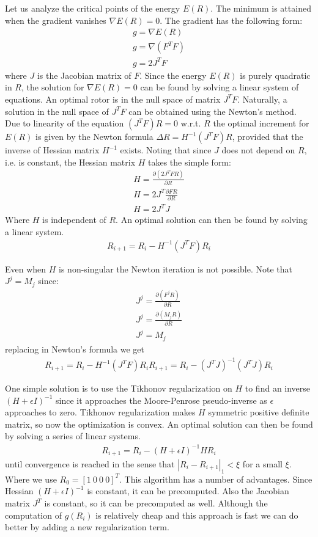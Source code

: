 \documentclass{birkjour}
\numberwithin{equation}{section}
\begin{document}
Let us analyze the critical points of the energy $E(R)$. The minimum is attained when the gradient vanishes $\nabla E(R) = 0$. The gradient has the following form:
\begin{eqnarray*}
g = \nabla E(R)\\
g = \nabla (F^T F)\\
g = 2 J^T F
\end{eqnarray*}
where $J$ is the Jacobian matrix of $F$. Since the energy $E(R)$ is purely quadratic in $R$, the solution for $\nabla E(R) = 0$ can be found by solving a linear system of equations. An optimal rotor is in the null space of matrix $J^T F$. Naturally, a solution in the null space of $J^T F$ can be obtained using the Newton's method. Due to linearity of the equation $(J^T F) R = 0$ w.r.t. $R$ the optimal increment for $E(R)$ is given by the Newton formula $\Delta R = H^{-1} (J^T F) R$, provided that the inverse of Hessian matrix $H^{-1}$ exists. Noting that since $J$ does not depend on $R$, i.e. is constant, the Hessian matrix $H$ takes the simple form:
\begin{eqnarray*}
H = \frac{\partial(2 J^T F R)}{\partial R} \\
H = 2 J^T \frac{\partial F R}{\partial R}\\
H = 2 J^T J
\end{eqnarray*}
Where $H$ is independent of $R$. An optimal solution can then be found by solving a linear system.
\begin{eqnarray*}
R_{i+1} = R_i - H^{-1} (J^T F) R_i
\end{eqnarray*}

Even when $H$ is non-singular the Newton iteration is not possible. Note that $J^j = M_j$ since:
\begin{eqnarray*}
J^j = \frac{\partial(F^j R)}{\partial R}\\
J^j = \frac{\partial(M_j R )}{\partial R}\\
J^j = M_j
\end{eqnarray*}
replacing in Newton's formula we get
\begin{eqnarray*}
R_{i+1} = R_i - H^{-1} (J^T F) R_i
R_{i+1} = R_i - (J^T J)^{-1} (J^T J) R_i
\end{eqnarray*}

One simple solution is to use the Tikhonov regularization on $H$ to find an inverse $(H + \epsilon I)^{-1}$ since it approaches the Moore-Penrose pseudo-inverse as $\epsilon$ approaches to zero. Tikhonov regularization makes $H$ symmetric positive definite matrix, so now the optimization is convex. An optimal solution can then be found by solving a series of linear systems.
\begin{eqnarray*}
R_{i+1} = R_i - (H + \epsilon I)^{-1} H R_i
\end{eqnarray*}
until convergence is reached in the sense that $|R_i - R_{i+1}|_1 < \xi$ for a small $\xi$. Where we use $R_0 = [1 \ 0 \ 0 \ 0]^T$. This algorithm has a number of advantages. Since Hessian $(H + \epsilon I)^{-1}$ is constant, it can be precomputed. Also the Jacobian matrix $J^T$ is constant, so it can be precomputed as well. Although the computation of $g(R_i)$ is relatively cheap and this approach is fast we can do better by adding a new regularization term.
\end{document}
